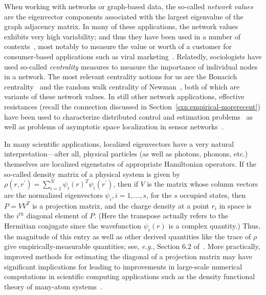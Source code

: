 \documentclass[twoside]{article}
\begin{document}
When working with networks or graph-based data, the so-called 
\emph{network values} are the eigenvector components associated with the 
largest eigenvalue of the graph adjacency matrix.
In many of these applications, the network values exhibits very high 
variability; and thus they have been used in a number of 
contexts~\cite{CF06_survey}, most notably to measure the value or worth of 
a customer for consumer-based applications such as viral 
marketing~\cite{RD02}.
Relatedly, sociologists have used so-called \emph{centrality} measures to 
measure the importance of individual nodes in a network.
The most relevant centrality notions for us are the Bonacich 
centrality~\cite{Bon87} and the random walk centrality of 
Newman~\cite{newman05_betweenness}, both of which are variants of these 
network values.
In still other network applications, effective resistances (recall the 
connection discussed in Section~\ref{sxn:empirical-morerecent}) have been 
used to characterize distributed control and estimation problems~\cite{BH06} 
as well as problems of asymptotic space localization in sensor 
networks~\cite{JLHB07}.

In many scientific applications, localized eigenvectors have a very natural 
interpretation---after all, physical particles (as well as photons, phonons, 
etc.) themselves are localized eigenstates of appropriate Hamiltonian 
operators.
If the so-called density matrix of a physical system is given by
$\rho(r,r^{'}) = \sum_{i=1}^{N} \psi_i(r)^{T}\psi_i(r^{'})$, then if 
$V$ is the matrix whose column vectors are the normalized eigenvectors 
$\psi_i, i=1,\ldots,s$, for the $s$ occupied states, then $P=VV^{T}$ is a
projection matrix, and the charge density at a point $r_i$ in space is the 
$i^{th}$ diagonal element of $P$.
(Here the transpose actually refers to the Hermitian conjugate since the 
wavefunction $\psi_i(r)$ is a complex quantity.)
Thus, the magnitude of this entry as well as other derived quantities like
the trace of $\rho$ give empirically-measurable quantities; see, 
\emph{e.g.}, Section $6.2$ of~\cite{SCS10}.
More practically, improved methods for estimating the diagonal of a 
projection matrix may have significant implications for leading to 
improvements in large-scale numerical computations in scientific computing 
applications such as the density functional theory of many-atom 
systems~\cite{SCS10,BKS07}.
\end{document}
